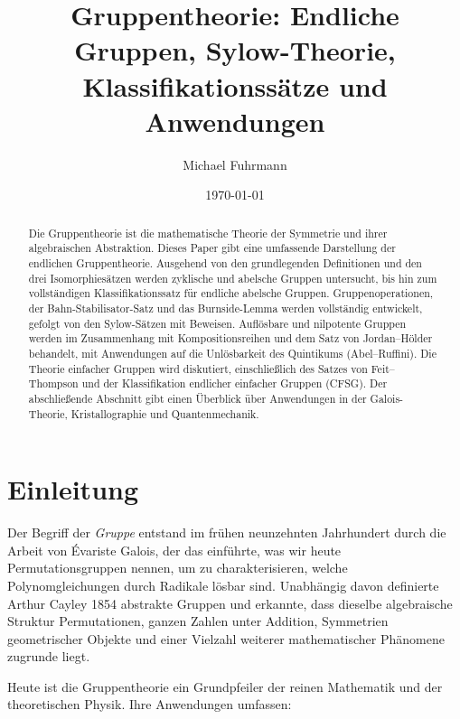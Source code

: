 \documentclass[12pt,a4paper]{amsart}
\title{Gruppentheorie: Endliche Gruppen, Sylow-Theorie,\\
       Klassifikationss\"atze und Anwendungen}
\author{Michael Fuhrmann}
\date{\today}
\theoremstyle{definition}
\begin{document}
\begin{abstract}
Die Gruppentheorie ist die mathematische Theorie der Symmetrie und ihrer algebraischen
Abstraktion. Dieses Paper gibt eine umfassende Darstellung der endlichen Gruppentheorie.
Ausgehend von den grundlegenden Definitionen und den drei Isomorphiesätzen werden zyklische
und abelsche Gruppen untersucht, bis hin zum vollständigen Klassifikationssatz für endliche
abelsche Gruppen. Gruppenoperationen, der Bahn-Stabilisator-Satz und das Burnside-Lemma
werden vollständig entwickelt, gefolgt von den Sylow-Sätzen mit Beweisen. Auflösbare und
nilpotente Gruppen werden im Zusammenhang mit Kompositionsreihen und dem Satz von
Jordan--Hölder behandelt, mit Anwendungen auf die Unlösbarkeit des Quintikums
(Abel--Ruffini). Die Theorie einfacher Gruppen wird diskutiert, einschließlich des Satzes
von Feit--Thompson und der Klassifikation endlicher einfacher Gruppen (CFSG). Der
abschließende Abschnitt gibt einen Überblick über Anwendungen in der Galois-Theorie,
Kristallographie und Quantenmechanik.
\end{abstract}

\maketitle
\tableofcontents

\section{Einleitung}
\label{sec:einleitung}

Der Begriff der \emph{Gruppe} entstand im frühen neunzehnten Jahrhundert durch die Arbeit
von \'{E}variste Galois, der das einführte, was wir heute Permutationsgruppen nennen, um zu
charakterisieren, welche Polynomgleichungen durch Radikale lösbar sind. Unabhängig davon
definierte Arthur Cayley 1854 abstrakte Gruppen und erkannte, dass dieselbe algebraische
Struktur Permutationen, ganzen Zahlen unter Addition, Symmetrien geometrischer Objekte und
einer Vielzahl weiterer mathematischer Phänomene zugrunde liegt.

Heute ist die Gruppentheorie ein Grundpfeiler der reinen Mathematik und der theoretischen
Physik. Ihre Anwendungen umfassen:
\end{document}
